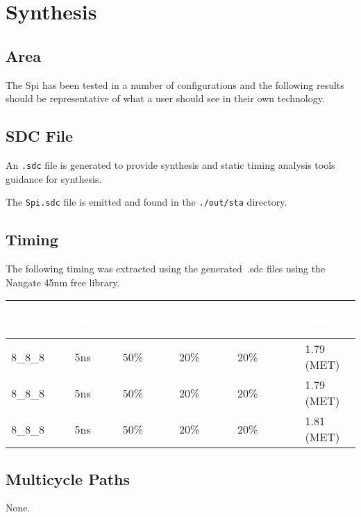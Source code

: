 \section{Synthesis}

\subsection{Area}

The Spi has been tested in a number of configurations and the following
results should be representative of what a user should see in their own
technology.



\subsection{SDC File}
An \texttt{.sdc} file is generated to provide synthesis and static timing
analysis tools guidance for synthesis.

The \texttt{Spi.sdc} file is emitted and found in the
\texttt{./out/sta} directory.

\subsection{Timing}

The following timing was extracted using the generated~.sdc files using the
Nangate 45nm free library.

\renewcommand*{\arraystretch}{1.4}
\begin{longtable}[H]{
    | p{}
    | p{}
    | p{}
    | p{}
    | p{}
    | p{} |
  }
  \hline
  \rowcolor{dark-gray}
  \textcolor{white}{\textbf{Config Name}}   &
  \textcolor{white}{\textbf{Period}}        &
  \textcolor{white}{\textbf{Duty Cycle}}    &
  \textcolor{white}{\textbf{Input Delay}}   &
  \textcolor{white}{\textbf{Output Delay}}  &
  \textcolor{white}{\textbf{Slack}}           \\ \hline \hline

  8\_8\_8     &
  5ns                    &
  50\%                   &
  20\%                   &
  20\%                   &
  1.79 (MET)               \\ \hline

  8\_8\_8  &
  5ns                    &
  50\%                   &
  20\%                   &
  20\%                   &
  1.79 (MET)               \\ \hline

  8\_8\_8  &
  5ns                    &
  50\%                   &
  20\%                   &
  20\%                   &
  1.81 (MET)               \\ \hline

  
\end{longtable}
\captionsetup{aboveskip=0pt}
\label{table:timing}
\endgroup

\subsection{Multicycle Paths}
None.
